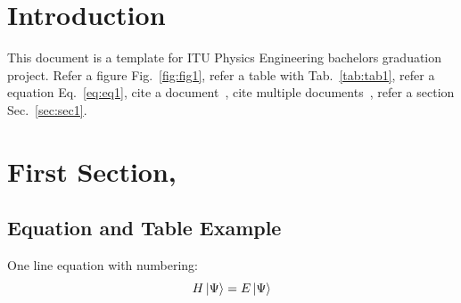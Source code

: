 \documentclass[12pt]{article}
\begin{document}

\onehalfspacing



\section*{}
\justifying

 
\clearpage



\section*{}
\justifying 


\clearpage


\renewcommand\contentsname{CONTENTS} 
\begingroup
    \let\clearpage\relax
    \tableofcontents
\endgroup
{}
\clearpage




\onehalfspacing

\section{Introduction}
This document is a template for ITU Physics Engineering bachelors graduation project. Refer a figure Fig.~\ref{fig:fig1}, refer a table with Tab.~\ref{tab:tab1}, refer a equation Eq.~\ref{eq:eq1}, cite a document~\cite{sakurai_modern_2010}, cite multiple documents~\cite{sakurai_modern_2010,kramer_quantumopticsjl_2018,baumgratz_quantifying_2014,verstraete_matrix_2008}, refer a section Sec.~\ref{sec:sec1}.



\section{First Section,\label{sec:sec1}}

\subsection{Equation and Table Example}
One line equation with numbering:
\begin{equation}
    H\ket{\Psi}=E\ket{\Psi}
    \label{eq:eq1}
\end{equation}
\end{document}
